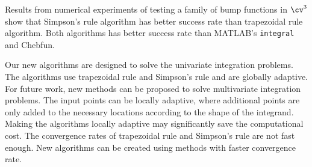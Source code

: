 \documentclass{iitthesis}
\theoremstyle{definition}
\theoremstyle{remark}
\begin{document}
Results from numerical experiments of testing a family of bump functions in $\cv^3$ show that Simpson's rule algorithm has better success rate than trapezoidal rule algorithm. Both algorithms has better success rate than MATLAB's {\tt integral} and Chebfun.

Our new algorithms are designed to solve the univariate integration problems. The algorithms use trapezoidal rule and Simpson's rule and are globally adaptive. For future work, new methods can be proposed to solve multivariate integration problems. The input points can be locally adaptive, where additional points are only added to the necessary locations according to the shape of the integrand. Making the algorithms locally adaptive may significantly save the computational cost. The convergence rates of trapezoidal rule and Simpson's rule are not fast enough. New algorithms can be created using methods with faster convergence rate.



\clearpage


%
%
%
%
%
%
%
%
%
%
%
%

%


\end{document}
